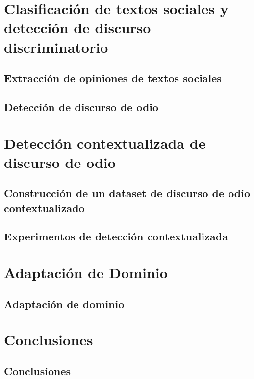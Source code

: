 \documentclass[11pt,a4paper,twoside]{tesis}
\begin{document}
\part{Clasificación de textos sociales y detección de discurso discriminatorio}
%
\chapter{Extracción de opiniones de textos sociales}

%
\chapter{Detección de discurso de odio}

%
% 
\part{Detección contextualizada de discurso de odio}
%
\chapter{Construcción de un dataset de discurso de odio contextualizado}

%
\chapter{Experimentos de detección contextualizada}

%

\part{Adaptación de Dominio}

\chapter{Adaptación de dominio}

%
\part{Conclusiones}
\chapter{Conclusiones}
%

%
\appendix
%





\backmatter

\end{document}
